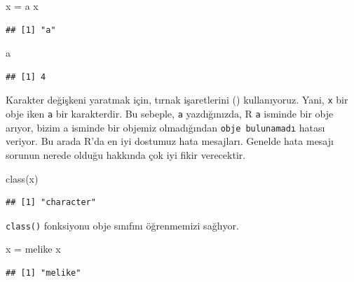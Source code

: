 \documentclass[
]{book}
\newenvironment{Shaded}{\begin{snugshade}}{\end{snugshade}}
\newcommand{\FunctionTok}[1]{\textcolor[rgb]{0.00,0.00,0.00}{#1}}
\newcommand{\NormalTok}[1]{#1}
\newcommand{\OtherTok}[1]{\textcolor[rgb]{0.56,0.35,0.01}{#1}}
\newcommand{\StringTok}[1]{\textcolor[rgb]{0.31,0.60,0.02}{#1}}
\begin{document}
\begin{Shaded}
\begin{Highlighting}[]
\NormalTok{x }\OtherTok{=} \StringTok{\textquotesingle{}a\textquotesingle{}}
\NormalTok{x}
\end{Highlighting}
\end{Shaded}

\begin{verbatim}
## [1] "a"
\end{verbatim}

\begin{Shaded}
\begin{Highlighting}[]
\NormalTok{a}
\end{Highlighting}
\end{Shaded}

\begin{verbatim}
## [1] 4
\end{verbatim}

Karakter değişkeni yaratmak için, tırnak işaretlerini (\texttt{\textquotesingle{}\textquotesingle{}}) kullanıyoruz. Yani, \texttt{x} bir obje iken \texttt{\textquotesingle{}a\textquotesingle{}} bir karakterdir. Bu sebeple, \texttt{a} yazdığınızda, R \texttt{a} isminde bir obje arıyor, bizim a isminde bir objemiz olmadığından \texttt{obje\ bulunamadı} hatası veriyor. Bu arada R'da en iyi dostumuz hata mesajları. Genelde hata mesajı sorunun nerede olduğu hakkında çok iyi fikir verecektir.

\begin{Shaded}
\begin{Highlighting}[]
\FunctionTok{class}\NormalTok{(x)}
\end{Highlighting}
\end{Shaded}

\begin{verbatim}
## [1] "character"
\end{verbatim}

\texttt{class()} fonksiyonu obje sınıfını öğrenmemizi sağlıyor.

\begin{Shaded}
\begin{Highlighting}[]
\NormalTok{x }\OtherTok{=} \StringTok{\textquotesingle{}melike\textquotesingle{}}
\NormalTok{x}
\end{Highlighting}
\end{Shaded}

\begin{verbatim}
## [1] "melike"
\end{verbatim}
\end{document}
